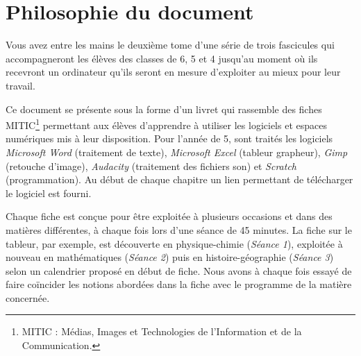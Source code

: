 \chapter*{Philosophie du document}



Vous avez entre les mains le deuxième tome d'une série de trois fascicules qui accompagneront les élèves des classes de 6, 5 et 4 jusqu'au moment où ils recevront un ordinateur qu'ils seront en mesure d'exploiter au mieux pour leur travail.

\vspace{18pt}

Ce document se présente sous la forme d'un livret qui rassemble des fiches MITIC\footnote{MITIC : Médias, Images et Technologies de l'Information et de la Communication.} permettant aux élèves d'apprendre à utiliser les logiciels et espaces numériques mis à leur disposition. Pour l'année de 5, sont traités les logiciels \emph{Microsoft Word} (traitement de texte), \emph{Microsoft Excel} (tableur grapheur), \emph{Gimp} (retouche d'image), \emph{Audacity} (traitement des fichiers son) et \emph{Scratch} (programmation). Au début de chaque chapitre un lien permettant de télécharger le logiciel est fourni.

\vspace{18pt}


Chaque fiche est conçue pour être exploitée à plusieurs occasions et dans des matières différentes, à chaque fois lors d'une séance de 45 minutes. La fiche sur le tableur, par exemple, est découverte en physique-chimie (\emph{Séance 1}), exploitée à nouveau en mathématiques (\emph{Séance 2}) puis en histoire-géographie (\emph{Séance 3}) selon un calendrier proposé en début de fiche. Nous avons à chaque fois essayé de faire coïncider les notions abordées dans la fiche avec le programme de la matière concernée.

\vspace{18pt}

